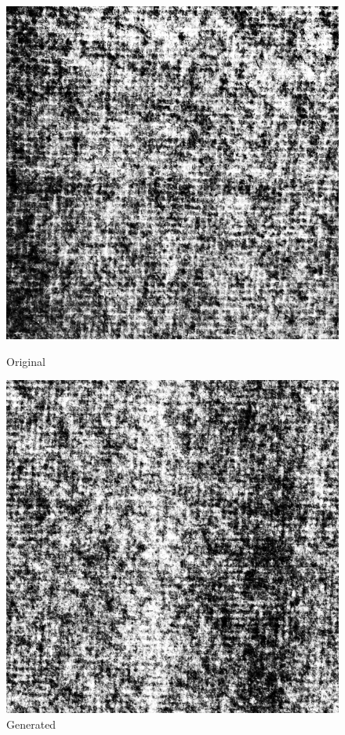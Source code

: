 \documentclass{article}
\begin{document}
    \begin{figure}[!htb]
    \begin{center}
      \includegraphics[scale=.3]{5/report/random/6.png}
      \caption{Original}
    \end{center}
    \endminipage \hfill
    \begin{center}
      \includegraphics[scale=.3]{5/report/random/6_c.png}
      \caption{Generated}
    \end{center}
    \endminipage
    \end{figure}
\end{document}
